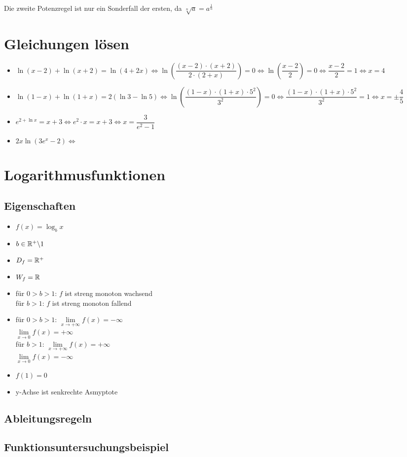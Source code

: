 \documentclass[../MAIN/main.tex]{subfiles}
\begin{document}
\begin{Bemerkung}
Die zweite Potenzregel ist nur ein Sonderfall der ersten, da $\sqrt[n]{a}=a^{\frac{1}{n}}$
\end{Bemerkung}

		\section{Gleichungen lösen}


\begin{Beispiel}
\begin{itemize}
\item $\ln(x-2)+\ln(x+2)=\ln(4+2x)\Leftrightarrow \ln\left(\dfrac{(x-2)\cdot (x+2)}{2\cdot (2+x)}\right)=0\Leftrightarrow \ln \left(\dfrac{x-2}{2}\right)=0\Leftrightarrow \dfrac{x-2}{2}=1\Leftrightarrow x=4$
\item $\ln (1-x) + \ln (1+x)=2(\ln3-\ln5)\Leftrightarrow \ln \left(\dfrac{(1-x)\cdot (1+x)\cdot 5^2 }{ 3^2}\right)=0\Leftrightarrow \dfrac{(1-x)\cdot (1+x)\cdot 5^2 }{ 3^2}=1\Leftrightarrow x=\pm  \dfrac{4}{5} $
\item$ e^{2+\ln x}=x+3\Leftrightarrow e^2 \cdot x=x+3\Leftrightarrow x=\dfrac{3}{e^2-1}$
\item $2x\ln (3e^x-2)\Leftrightarrow$
\end{itemize}
\end{Beispiel}


		\section{Logarithmusfunktionen}


	\subsection{Eigenschaften}

\begin{itemize}
\item$f(x)=\log_bx$
\item$b\in\mathbb{R}^+\backslash 1$
\item$D_f=\mathbb{R}^+$
\item$W_f=\mathbb{R}$
\item für $0>b>1$: $f$ ist streng monoton wachsend\\
für $b>1$: $f$ ist streng monoton fallend
\item für $0>b>1$: $\lim\limits_{x\to +\infty}f(x)=-\infty$\\
			$\lim\limits_{x\to 0}f(x)=+\infty$\\
für $b>1$: $\lim\limits_{x\to +\infty}f(x)=+\infty$\\
	        $\lim\limits_{x\to 0}f(x)=-\infty$
\item $f(1)=0$
\item y-Achse ist senkrechte Asmyptote
\end{itemize}


	\subsection{Ableitungsregeln}
	\subsection{Funktionsuntersuchungsbeispiel}
\end{document}
